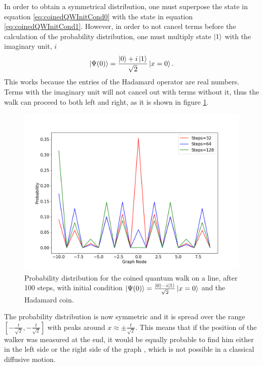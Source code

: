 \documentclass[../../dissertation.tex]{subfiles}
\begin{document}
In order to obtain a symmetrical distribution, one must superpose the state in equation \ref{eq:coinedQWInitCond0} with the state in equation \ref{eq:coinedQWInitCond1}. However, in order to not cancel terms before the calculation of the probability distribution, one must multiply state $\ket{1}$ with the imaginary unit, $i$ 
\begin{equation}
	\ket{\Psi(0)} = \frac{\ket{0}+i\ket{1}}{\sqrt{2}}\ket{x=0}.
	\label{eq:12}
\end{equation}
This works because the entries of the Hadamard operator are real numbers. Terms with the imaginary unit will not cancel out with terms without it, thus the walk can proceed to both left and right, as it is shown in figure \ref{fig:coinedQWDist01}. 
\begin{figure}[!ht]
	\centering
	\includegraphics[scale=0.40]{img/CoinedQuantumWalk/CoinedMultiple_psi01_3264128}
	\caption{Probability distribution for the coined quantum walk on a line, after 100 steps, with initial condition $\ket{\Psi(0)}=\frac{\ket{0}-i\ket{1}}{\sqrt{2}}\ket{x=0}$ and the Hadamard coin.} 
	\label{fig:coinedQWDist01}
\end{figure}\par
The probability distribution is now symmetric and it is spread over the range $[-\frac{t}{\sqrt{2}},-\frac{t}{\sqrt{2}}]$ with peaks around $x \approx \pm \frac{t}{\sqrt{2}}$. This means that if the position of the walker was measured at the end, it would be equally probable to find him either in the left side or the right side of the graph , which is not possible in a classical diffusive motion.\par
\end{document}
